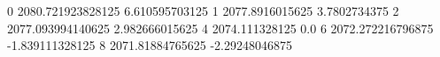 0 2080.721923828125 6.610595703125
1 2077.8916015625 3.7802734375
2 2077.093994140625 2.982666015625
4 2074.111328125 0.0
6 2072.272216796875 -1.839111328125
8 2071.81884765625 -2.29248046875
